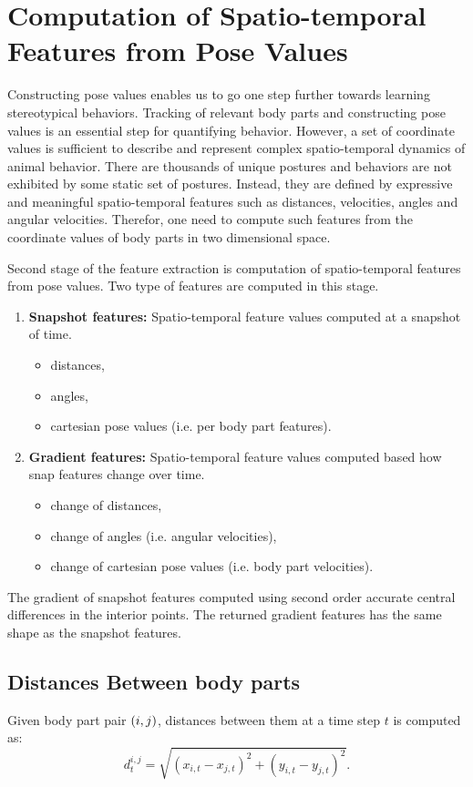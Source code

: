 \section{Computation of Spatio-temporal Features from Pose Values}
Constructing pose values enables us to go one step further towards learning stereotypical behaviors.
Tracking of relevant body parts and constructing pose values is an essential step for quantifying behavior.
However, a set of coordinate values is sufficient to describe and represent complex spatio-temporal dynamics of animal behavior.
There are thousands of unique postures and behaviors are not exhibited by some static set of postures.
Instead, they are defined by expressive and meaningful spatio-temporal features such as distances, velocities, angles and angular velocities.
Therefor, one need to compute such features from the coordinate values of body parts in two dimensional space.

Second stage of the feature extraction is computation of spatio-temporal features from pose values. Two type of features are computed in this stage.
\begin{enumerate}
	\item \textbf{Snapshot features:} Spatio-temporal feature values computed at a snapshot of time.
	      \begin{itemize}
		      \item distances,
		      \item angles,
		      \item cartesian pose values (i.e. per body part features).
	      \end{itemize}
	\item \textbf{Gradient features:} Spatio-temporal feature values computed based how snap features change over time.
	      \begin{itemize}
		      \item change of distances,
		      \item change of angles (i.e. angular velocities),
		      \item change of cartesian pose values (i.e. body part velocities).
	      \end{itemize}
\end{enumerate}

The gradient of snapshot features computed using second order accurate central differences in the interior points. The returned gradient features has the same shape as the snapshot features.

\subsection{Distances Between body parts}
Given body part pair $\left(i,j\right)$, distances between them at a time step $t$ is computed as:
\begin{equation}
	d^{i,j}_t = \sqrt{(x_{i,t} - x_{j,t})^2 + (y_{i,t} - y_{j,t})^2}.
\end{equation}

